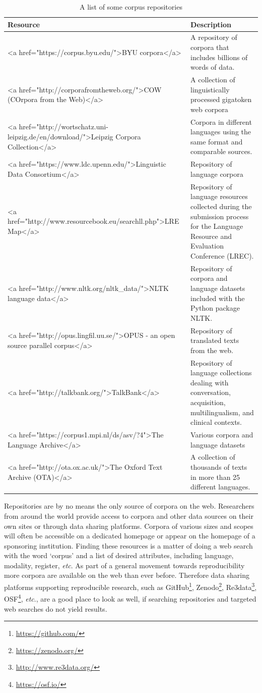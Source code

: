 \documentclass[
  letterpaper,
]{scrbook}
\DeclareRobustCommand{\href}[2]{#2\footnote{\url{#1}}}
\begin{document}
\begin{table}

\caption{A list of some corpus repositories}
\centering
\begin{tabular}[t]{l|l}
\hline
Resource & Description\\
\hline
<a href="https://corpus.byu.edu/">BYU corpora</a> & A repository of corpora that includes billions of words of data.\\
\hline
<a href="http://corporafromtheweb.org/">COW (COrpora from the Web)</a> & A collection of linguistically processed gigatoken web corpora\\
\hline
<a href="http://wortschatz.uni-leipzig.de/en/download/">Leipzig Corpora Collection</a> & Corpora in different languages using the same format and comparable sources.\\
\hline
<a href="https://www.ldc.upenn.edu/">Linguistic Data Consortium</a> & Repository of language corpora\\
\hline
<a href="http://www.resourcebook.eu/searchll.php">LRE Map</a> & Repository of language resources collected during the submission process for the Language Resource and Evaluation Conference (LREC).\\
\hline
<a href="http://www.nltk.org/nltk\_data/">NLTK language data</a> & Repository of corpora and language datasets included with the Python package NLTK.\\
\hline
<a href="http://opus.lingfil.uu.se/">OPUS - an open source parallel corpus</a> & Repository of translated texts from the web.\\
\hline
<a href="http://talkbank.org/">TalkBank</a> & Repository of language collections dealing with conversation, acquisition, multilingualism, and clinical contexts.\\
\hline
<a href="https://corpus1.mpi.nl/ds/asv/?4">The Language Archive</a> & Various corpora and language datasets\\
\hline
<a href="http://ota.ox.ac.uk/">The Oxford Text Archive (OTA)</a> & A collection of thousands of texts in more than 25 different languages.\\
\hline
\end{tabular}
\end{table}

Repositories are by no means the only source of corpora on the web.
Researchers from around the world provide access to corpora and other
data sources on their own sites or through data sharing platforms.
Corpora of various sizes and scopes will often be accessible on a
dedicated homepage or appear on the homepage of a sponsoring
institution. Finding these resources is a matter of doing a web search
with the word `corpus' and a list of desired attributes, including
language, modality, register, \emph{etc}. As part of a general movement
towards reproducibility more corpora are available on the web than ever
before. Therefore data sharing platforms supporting reproducible
research, such as \href{https://github.com/}{GitHub},
\href{https://zenodo.org/}{Zenodo},
\href{http://www.re3data.org/}{Re3data}, \href{https://osf.io/}{OSF},
\emph{etc}., are a good place to look as well, if searching repositories
and targeted web searches do not yield results.
\end{document}

